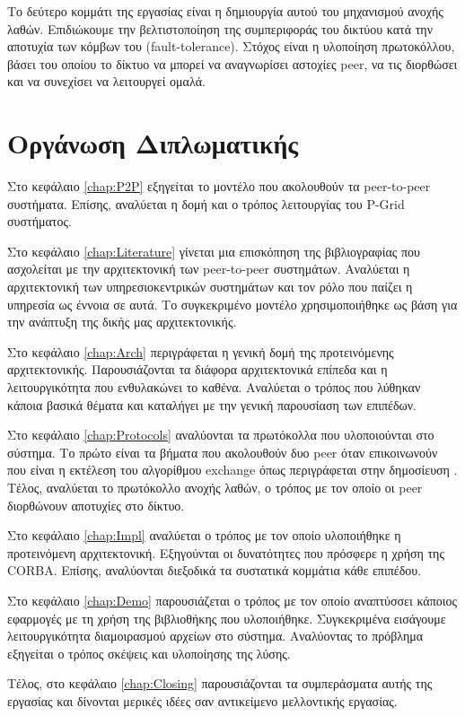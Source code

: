 Το δεύτερο κομμάτι της εργασίας είναι η δημιουργία αυτού του μηχανισμού 
ανοχής λαθών. Επιδιώκουμε την βελτιστοποίηση της συμπεριφοράς του 
δικτύου κατά την αποτυχία των κόμβων του (fault-tolerance). Στόχος είναι 
η υλοποίηση πρωτοκόλλου, βάσει του οποίου το δίκτυο να μπορεί να αναγνωρίσει 
αστοχίες peer, να τις διορθώσει και να συνεχίσει να λειτουργεί ομαλά.

\section{Οργάνωση Διπλωματικής}

Στο κεφάλαιο \ref{chap:P2P} εξηγείται το μοντέλο που ακολουθούν τα 
peer-to-peer συστήματα. Επίσης, αναλύεται η δομή και ο τρόπος λειτουργίας 
του P-Grid 
\citep{Abererb, Aberer, Abererc, Abererd, Aberer2004, Aberer2003, Aberere, Aberer2002} 
συστήματος.

Στο κεφάλαιο \ref{chap:Literature} γίνεται μια επισκόπηση της βιβλιογραφίας 
που ασχολείται με την αρχιτεκτονική των peer-to-peer συστημάτων. 
Αναλύεται η αρχιτεκτονική των υπηρεσιοκεντρικών συστημάτων και τον ρόλο 
που παίζει η υπηρεσία ως έννοια σε αυτά. Το συγκεκριμένο μοντέλο 
χρησιμοποιήθηκε ως βάση για την ανάπτυξη της δικής μας αρχιτεκτονικής.

Στο κεφάλαιο \ref{chap:Arch} περιγράφεται η γενική δομή της προτεινόμενης 
αρχιτεκτονικής. Παρουσιάζονται τα διάφορα αρχιτεκτονικά επίπεδα και η 
λειτουργικότητα που ενθυλακώνει το καθένα. Αναλύεται ο τρόπος που λύθηκαν 
κάποια βασικά θέματα και καταλήγει με την γενική παρουσίαση των 
επιπέδων.

Στο κεφάλαιο \ref{chap:Protocols} αναλύονται τα πρωτόκολλα που υλοποιούνται 
στο σύστημα. Το πρώτο είναι τα βήματα που ακολουθούν δυο peer όταν 
επικοινωνούν που είναι η εκτέλεση του αλγορίθμου exchange όπως περιγράφεται 
στην δημοσίευση \citep{Abererb}. Τέλος, αναλύεται το πρωτόκολλο ανοχής λαθών, 
ο τρόπος με τον οποίο οι peer διορθώνουν αποτυχίες στο δίκτυο.

Στο κεφάλαιο \ref{chap:Impl} αναλύεται ο τρόπος με τον οποίο υλοποιήθηκε 
η προτεινόμενη αρχιτεκτονική. Εξηγούνται οι δυνατότητες που πρόσφερε η 
χρήση της CORBA. Επίσης, αναλύονται διεξοδικά τα συστατικά κομμάτια κάθε 
επιπέδου.

Στο κεφάλαιο \ref{chap:Demo} παρουσιάζεται ο τρόπος με τον οποίο αναπτύσσει 
κάποιος εφαρμογές με τη χρήση της βιβλιοθήκης που υλοποιήθηκε. Συγκεκριμένα 
εισάγουμε λειτουργικότητα διαμοιρασμού αρχείων στο σύστημα. Αναλύοντας το 
πρόβλημα εξηγείται ο τρόπος σκέψεις και υλοποίησης της λύσης.

Τέλος, στο κεφάλαιο \ref{chap:Closing} παρουσιάζονται τα συμπεράσματα αυτής 
της εργασίας και δίνονται μερικές ιδέες σαν αντικείμενο μελλοντικής εργασίας.
